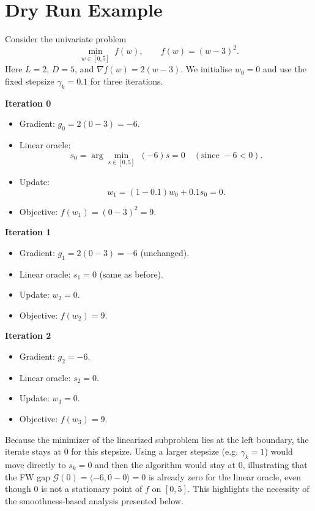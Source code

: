 \documentclass{article}
\newcommand{\gap}{\mathcal{G}}
\begin{document}
\section*{Dry Run Example}
Consider the univariate problem
\[
\min_{w\in[0,5]}\;f(w),\qquad f(w)=(w-3)^2 .
\]
Here $L=2$, $D=5$, and $\nabla f(w)=2(w-3)$.  
We initialise $w_0=0$ and use the fixed stepsize $\gamma_k=0.1$ for three
iterations.

\medskip
\noindent\textbf{Iteration 0}
\begin{itemize}
\item Gradient: $g_0=2(0-3)=-6$.
\item Linear oracle:
  \[
  s_0=\arg\min_{s\in[0,5]}\;(-6)s = 0\quad(\text{since }-6<0).
  \]
\item Update:
  \[
  w_1=(1-0.1)w_0+0.1 s_0 =0 .
  \]
\item Objective: $f(w_1)=(0-3)^2=9$.
\end{itemize}

\noindent\textbf{Iteration 1}
\begin{itemize}
\item Gradient: $g_1=2(0-3)=-6$ (unchanged).
\item Linear oracle: $s_1=0$ (same as before).
\item Update: $w_2=0$.
\item Objective: $f(w_2)=9$.
\end{itemize}

\noindent\textbf{Iteration 2}
\begin{itemize}
\item Gradient: $g_2=-6$.
\item Linear oracle: $s_2=0$.
\item Update: $w_3=0$.
\item Objective: $f(w_3)=9$.
\end{itemize}
Because the minimizer of the linearized subproblem lies at the left
boundary, the iterate stays at $0$ for this stepsize.  Using a larger
stepsize (e.g. $\gamma_k=1$) would move directly to $s_k=0$ and then
the algorithm would stay at $0$, illustrating that the FW gap
$\gap(0)=\langle -6,0-0\rangle=0$ is already zero for the linear oracle,
even though $0$ is not a stationary point of $f$ on $[0,5]$.  This
highlights the necessity of the smoothness‑based analysis presented
below.
\end{document}
